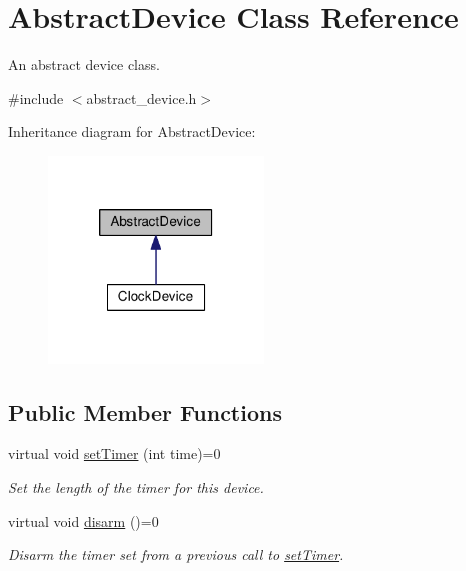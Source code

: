 \hypertarget{classAbstractDevice}{\section{\-Abstract\-Device \-Class \-Reference}
\label{db/d0e/classAbstractDevice}
}


\-An abstract device class.  




{\ttfamily \#include $<$abstract\-\_\-device.\-h$>$}



\-Inheritance diagram for \-Abstract\-Device\-:\nopagebreak
\begin{figure}[H]
\begin{center}
\leavevmode
\includegraphics[width=162pt]{dd/d4d/classAbstractDevice__inherit__graph}
\end{center}
\end{figure}
\subsection*{\-Public \-Member \-Functions}
\begin{DoxyCompactItemize}
\item 
virtual void \hyperlink{classAbstractDevice_adbf2b1dbd7d51896697fce8ae924f286}{set\-Timer} (int time)=0
\begin{DoxyCompactList}\small\item\em \-Set the length of the timer for this device. \end{DoxyCompactList}\item 
\hypertarget{classAbstractDevice_a79059fee864bb0cca04e57e5f5a84401}{virtual void \hyperlink{classAbstractDevice_a79059fee864bb0cca04e57e5f5a84401}{disarm} ()=0}\label{db/d0e/classAbstractDevice_a79059fee864bb0cca04e57e5f5a84401}

\begin{DoxyCompactList}\small\item\em \-Disarm the timer set from a previous call to \hyperlink{classAbstractDevice_adbf2b1dbd7d51896697fce8ae924f286}{set\-Timer}. \end{DoxyCompactList}\end{DoxyCompactItemize}


